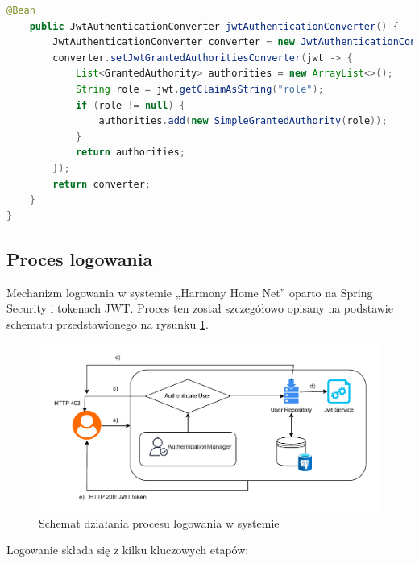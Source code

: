 \begin{lstlisting}[language=Java, style=JavaStyle, caption=Pełna konfiguracja łańcucha filtrów bezpieczeństwa]
    @Bean
    public JwtAuthenticationConverter jwtAuthenticationConverter() {
        JwtAuthenticationConverter converter = new JwtAuthenticationConverter();
        converter.setJwtGrantedAuthoritiesConverter(jwt -> {
            List<GrantedAuthority> authorities = new ArrayList<>();
            String role = jwt.getClaimAsString("role");
            if (role != null) {
                authorities.add(new SimpleGrantedAuthority(role));
            }
            return authorities;
        });
        return converter;
    }
}
\end{lstlisting}

\subsection{Proces logowania}

Mechanizm logowania w systemie „Harmony Home Net” oparto na Spring Security i tokenach JWT. Proces ten został szczegółowo opisany na podstawie schematu przedstawionego na rysunku \ref{fig:ebok_db_concept}.

\begin{figure}[ht]
    \centering
    \includegraphics[width=.9\linewidth]{rys03/proces_logowania}
    \caption{Schemat działania procesu logowania w systemie~\cite{JWToauth}}
    \label{fig:ebok_db_concept}
\end{figure}

Logowanie składa się z kilku kluczowych etapów:

